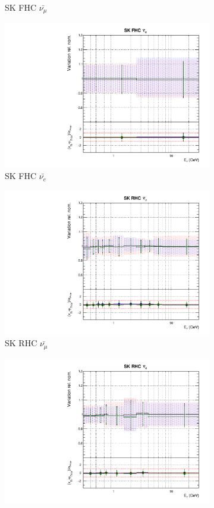 \begin{figure}
\begin{subfigure}{0.24\textwidth}
  \caption{SK FHC $\bar{\nu_{\mu}}$}
\end{subfigure}
\begin{subfigure}{0.24\textwidth}
  \centering
  \includegraphics[width=0.95\linewidth]{figs/polyasmvsflux_11}
  \caption{SK FHC $\bar{\nu_{e}}$}
\end{subfigure}
\begin{subfigure}{0.24\textwidth}
  \centering
  \includegraphics[width=0.95\linewidth]{figs/polyasmvsflux_12}
  \caption{SK RHC $\bar{\nu_{\mu}}$}
\end{subfigure}
\begin{subfigure}{0.24\textwidth}
  \centering
  \includegraphics[width=0.95\linewidth]{figs/polyasmvsflux_13}

\end{subfigure}
\end{figure}
